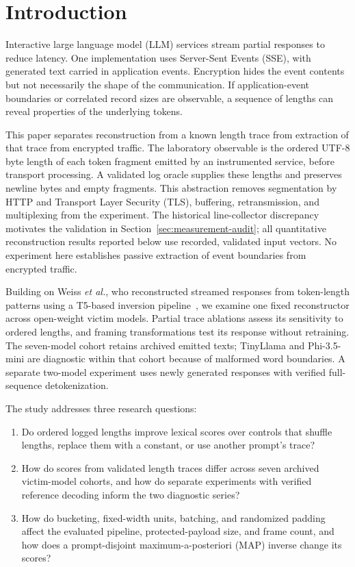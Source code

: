 \documentclass[electronics,article,submit,pdftex,moreauthors]{Definitions/mdpi}
\begin{document}
\section{Introduction}
Interactive large language model (LLM) services stream partial responses to reduce latency. One implementation uses Server-Sent Events (SSE), with generated text carried in application events. Encryption hides the event contents but not necessarily the shape of the communication. If application-event boundaries or correlated record sizes are observable, a sequence of lengths can reveal properties of the underlying tokens.

This paper separates reconstruction from a known length trace from extraction of that trace from encrypted traffic. The laboratory observable is the ordered UTF-8 byte length of each token fragment emitted by an instrumented service, before transport processing. A validated log oracle supplies these lengths and preserves newline bytes and empty fragments. This abstraction removes segmentation by HTTP and Transport Layer Security (TLS), buffering, retransmission, and multiplexing from the experiment. The historical line-collector discrepancy motivates the validation in Section~\ref{sec:measurement-audit}; all quantitative reconstruction results reported below use recorded, validated input vectors. No experiment here establishes passive extraction of event boundaries from encrypted traffic.

Building on Weiss \emph{et al.}, who reconstructed streamed responses from token-length patterns using a T5-based inversion pipeline~\cite{weiss2024prompt}, we examine one fixed reconstructor across open-weight victim models. Partial trace ablations assess its sensitivity to ordered lengths, and framing transformations test its response without retraining. The seven-model cohort retains archived emitted texts; TinyLlama and Phi-3.5-mini are diagnostic within that cohort because of malformed word boundaries. A separate two-model experiment uses newly generated responses with verified full-sequence detokenization.

The study addresses three research questions:
\begin{enumerate}[label=\textbf{RQ\arabic*:},leftmargin=4.2em,labelwidth=3.2em,labelsep=0.6em]
    \item Do ordered logged lengths improve lexical scores over controls that shuffle lengths, replace them with a constant, or use another prompt's trace?
    \item How do scores from validated length traces differ across seven archived victim-model cohorts, and how do separate experiments with verified reference decoding inform the two diagnostic series?
    \item How do bucketing, fixed-width units, batching, and randomized padding affect the evaluated pipeline, protected-payload size, and frame count, and how does a prompt-disjoint maximum-a-posteriori (MAP) inverse change its scores?
\end{enumerate}
\end{document}
